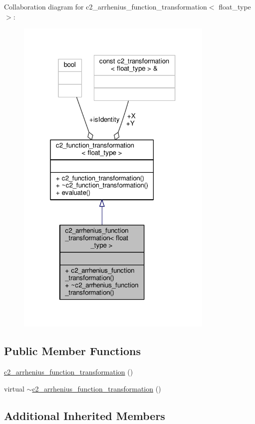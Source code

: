 Collaboration diagram for c2\+\_\+arrhenius\+\_\+function\+\_\+transformation$<$ float\+\_\+type $>$\+:
\nopagebreak
\begin{figure}[H]
\begin{center}
\leavevmode
\includegraphics[width=268pt]{classc2__arrhenius__function__transformation__coll__graph}
\end{center}
\end{figure}
\subsection*{Public Member Functions}
\begin{DoxyCompactItemize}
\item 
\hyperlink{classc2__arrhenius__function__transformation_ab4e5ad591973223667fb4571687032be}{c2\+\_\+arrhenius\+\_\+function\+\_\+transformation} ()
\item 
virtual \hyperlink{classc2__arrhenius__function__transformation_a9bd08a6cf4f8e07617c5c4e877a747e2}{$\sim$c2\+\_\+arrhenius\+\_\+function\+\_\+transformation} ()
\end{DoxyCompactItemize}
\subsection*{Additional Inherited Members}


